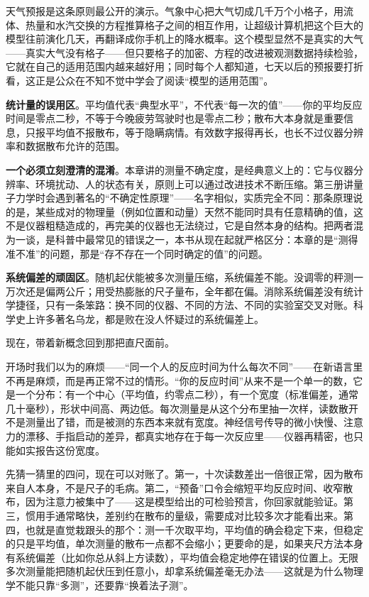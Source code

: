 天气预报是这条原则最公开的演示。气象中心把大气切成几千万个小格子，用流体、热量和水汽交换的方程推算格子之间的相互作用，让超级计算机把这个巨大的模型往前演化几天，再翻译成你手机上的降水概率。这个模型显然不是真实的大气——真实大气没有格子——但只要格子的加密、方程的改进被观测数据持续检验，它就在自己的适用范围内越来越好用；同时每个人都知道，七天以后的预报要打折看，这正是公众在不知不觉中学会了阅读“模型的适用范围”。

\textbf{统计量的误用区}。平均值代表“典型水平”，不代表“每一次的值”——你的平均反应时间是零点二秒，不等于今晚疲劳驾驶时也是零点二秒；散布大本身就是重要信息，只报平均值不报散布，等于隐瞒病情。有效数字报得再长，也长不过仪器分辨率和数据散布允许的范围。

\textbf{一个必须立刻澄清的混淆}。本章讲的测量不确定度，是经典意义上的：它与仪器分辨率、环境扰动、人的状态有关，原则上可以通过改进技术不断压缩。第三册讲量子力学时会遇到著名的“不确定性原理”——名字相似，实质完全不同：那条原理说的是，某些成对的物理量（例如位置和动量）天然不能同时具有任意精确的值，这不是仪器粗糙造成的，再完美的仪器也无法绕过，它是自然本身的结构。把两者混为一谈，是科普中最常见的错误之一，本书从现在起就严格区分：本章的是“测得准不准”的问题，那是“存不存在一个同时确定的值”的问题。

\textbf{系统偏差的顽固区}。随机起伏能被多次测量压缩，系统偏差不能。没调零的秤测一万次还是偏两公斤；用受热膨胀的尺子量布，全年都在偏。消除系统偏差没有统计学捷径，只有一条笨路：换不同的仪器、不同的方法、不同的实验室交叉对账。科学史上许多著名乌龙，都是败在没人怀疑过的系统偏差上。


现在，带着新概念回到那把直尺面前。

开场时我们以为的麻烦——“同一个人的反应时间为什么每次不同”——在新语言里不再是麻烦，而是再正常不过的情形。“你的反应时间”从来不是一个单一的数，它是一个分布：有一个中心（平均值，约零点二秒），有一个宽度（标准偏差，通常几十毫秒），形状中间高、两边低。每次测量是从这个分布里抽一次样，读数散开不是测量出了错，而是被测的东西本来就有宽度。神经信号传导的微小快慢、注意力的漂移、手指启动的差异，都真实地存在于每一次反应里——仪器再精密，也只能如实报告这份宽度。

先猜一猜里的四问，现在可以对账了。第一，十次读数差出一倍很正常，因为散布来自人本身，不是尺子的毛病。第二，“预备”口令会缩短平均反应时间、收窄散布，因为注意力被集中了——这是模型给出的可检验预言，你回家就能验证。第三，惯用手通常略快，差别约在散布的量级，需要成对比较多次才能看出来。第四，也就是直觉栽跟头的那个：测一千次取平均，平均值的确会稳定下来，但稳定的只是平均值，单次测量的散布一点都不会缩小；更要命的是，如果夹尺方法本身有系统偏差（比如你总从斜上方读数），平均值会稳定地停在错误的位置上。无限多次测量能把随机起伏压到任意小，却拿系统偏差毫无办法——这就是为什么物理学不能只靠“多测”，还要靠“换着法子测”。


